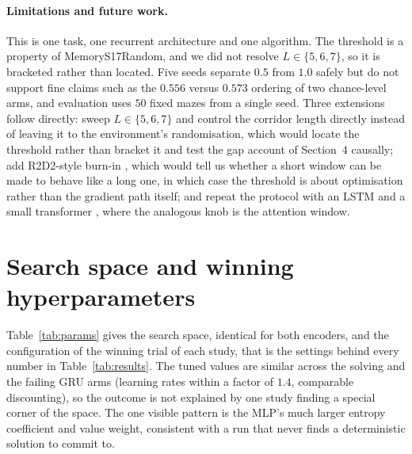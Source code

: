 \documentclass{article}
\begin{document}
\paragraph{Limitations and future work.} This is one task, one recurrent
architecture and one algorithm. The threshold is a property of
MemoryS17Random, and we did not resolve $L \in \{5,6,7\}$, so it is bracketed
rather than located. Five seeds separate $0.5$ from $1.0$ safely but do not support
fine claims such as the $0.556$ versus $0.573$ ordering of two chance-level
arms, and evaluation uses $50$ fixed mazes from a single seed. Three extensions
follow directly: sweep $L \in \{5,6,7\}$ and control the corridor length
directly instead of leaving it to the environment's randomisation, which would
locate the threshold rather than bracket it and test the gap account of
Section~4 causally; add R2D2-style burn-in \citep{r2d2}, which
would tell us whether a short window can be made to behave like a long one, in which case the threshold is about optimisation rather
than the gradient path itself; and repeat the protocol with an LSTM
\citep{lstm} and a small transformer \citep{gtrxl}, where the analogous knob is
the attention window.

\newpage



\newpage
\appendix
\section{Search space and winning hyperparameters}
\label{app:params}

Table~\ref{tab:params} gives the search space, identical for both encoders, and
the configuration of the winning trial of each study, that is the settings
behind every number in Table~\ref{tab:results}. The tuned values are similar
across the solving and the failing GRU arms (learning rates within a factor of
$1.4$, comparable discounting), so the outcome is not explained by one study
finding a special corner of the space. The one visible pattern is the MLP's much
larger entropy coefficient and value weight, consistent with a run that never
finds a deterministic solution to commit to.
\end{document}
